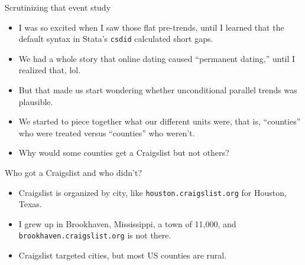 \documentclass[aspectratio=169,11pt]{beamer}
\begin{document}
\begin{frame}[shrink=5]{Scrutinizing that event study}
\vspace{0.3em}
\begin{itemize}\small\setlength\itemsep{0.5em}
  \item I was so excited when I saw those flat pre-trends, until I learned that the default syntax in Stata's \texttt{csdid} calculated short gaps.
  \item We had a whole story that online dating caused ``permanent dating,'' until I realized that, lol.
  \item But that made us start wondering whether unconditional parallel trends was plausible.
  \item We started to piece together what our different units were, that is, ``counties'' who were treated versus ``counties'' who weren't.
  \item Why would some counties get a Craigslist but not others?
\end{itemize}
\end{frame}

\begin{frame}{Who got a Craigslist and who didn't?}
\vspace{0.6em}
\begin{itemize}\setlength\itemsep{0.8em}
  \item Craigslist is organized by city, like \texttt{houston.craigslist.org} for Houston, Texas.
  \item I grew up in Brookhaven, Mississippi, a town of 11,000, and \texttt{brookhaven.craigslist.org} is not there.
  \item Craigslist targeted cities, but most US counties are rural.
\end{itemize}
\end{frame}
\end{document}
